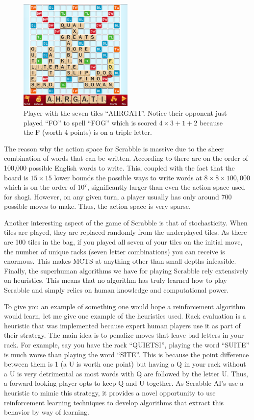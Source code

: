 \documentclass{article}
\begin{document}
  \begin{figure}[H]
    \centering
      \includegraphics[width=0.5\textwidth]{scrabble}
    \caption[Example Scrabble board]{Player with the seven tiles ``AHRGATI''. Notice their opponent just played ``FO'' to spell ``FOG'' which is scored $4 \times 3 + 1 + 2$ because the F (worth 4 points) is on a triple letter.}
  \end{figure}

  The reason why the action space for Scrabble is massive due to the sheer combination of words that can be written. According to \cite{sheppard_world-championship-caliber_2002} there are on the order of 100,000 possible English words to write. This, coupled with the fact that the board is $15 \times 15$ lower bounds the possible ways to write words at $8 \times 8 \times 100,000$ which is on the order of $10^7$, significantly larger than even the action space used for shogi. However, on any given turn, a player usually has only around 700 possible moves to make. Thus, the action space is very sparse.

  Another interesting aspect of the game of Scrabble is that of stochasticity. When tiles are played, they are replaced randomly from the underplayed tiles. As there are 100 tiles in the bag, if you played all seven of your tiles on the initial move, the number of unique racks (seven letter combinations) you can receive is enormous. This makes MCTS at anything other than small depths infeasible. Finally, the superhuman algorithms we have for playing Scrabble rely extensively on heuristics. This means that no algorithm has truly learned how to play Scrabble and simply relies on human knowledge and computational power.

  To give you an example of something one would hope a reinforcement algorithm would learn, let me give one example of the heuristics used. Rack evaluation is a heuristic that was implemented because expert human players use it as part of their strategy. The main idea is to penalize moves that leave bad letters in your rack. For example, say you have the rack ``QUIETSI'', playing the word ``SUITE'' is much worse than playing the word ``SITE''. This is because the point difference between them is 1 (a U is worth one point) but having a Q in your rack without a U is very detrimental as most words with Q are followed by the letter U. Thus, a forward looking player opts to keep Q and U together. As Scrabble AI's use a heuristic to mimic this strategy, it provides a novel opportunity to use reinforcement learning techniques to develop algorithms that extract this behavior by way of learning.
\end{document}
